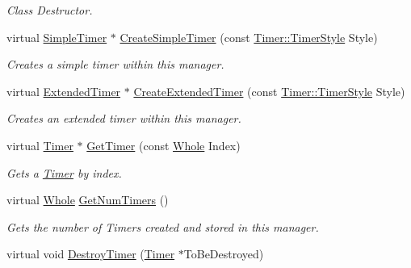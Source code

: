 \begin{DoxyCompactItemize}
\begin{DoxyCompactList}\small\item\em Class Destructor. \item\end{DoxyCompactList}\item 
virtual \hyperlink{classphys_1_1SimpleTimer}{SimpleTimer} $\ast$ \hyperlink{classphys_1_1TimerManager_a7d666a65aee80dd354dfdd6de671e186}{CreateSimpleTimer} (const \hyperlink{classphys_1_1Timer_a1ee86bf43e20329d750c5d582dcce329}{Timer::TimerStyle} Style)
\begin{DoxyCompactList}\small\item\em Creates a simple timer within this manager. \item\end{DoxyCompactList}\item 
virtual \hyperlink{classphys_1_1ExtendedTimer}{ExtendedTimer} $\ast$ \hyperlink{classphys_1_1TimerManager_a44ba4749b2ca6c31994813e97f88ec79}{CreateExtendedTimer} (const \hyperlink{classphys_1_1Timer_a1ee86bf43e20329d750c5d582dcce329}{Timer::TimerStyle} Style)
\begin{DoxyCompactList}\small\item\em Creates an extended timer within this manager. \item\end{DoxyCompactList}\item 
virtual \hyperlink{classphys_1_1Timer}{Timer} $\ast$ \hyperlink{classphys_1_1TimerManager_a5e2912df5f17cd8af1ab8457b95c5a75}{GetTimer} (const \hyperlink{namespacephys_a460f6bc24c8dd347b05e0366ae34f34a}{Whole} Index)
\begin{DoxyCompactList}\small\item\em Gets a \hyperlink{classphys_1_1Timer}{Timer} by index. \item\end{DoxyCompactList}\item 
virtual \hyperlink{namespacephys_a460f6bc24c8dd347b05e0366ae34f34a}{Whole} \hyperlink{classphys_1_1TimerManager_a70ea3a58c3b71cd79a3e9a8b0f069dd5}{GetNumTimers} ()
\begin{DoxyCompactList}\small\item\em Gets the number of Timers created and stored in this manager. \item\end{DoxyCompactList}\item 
virtual void \hyperlink{classphys_1_1TimerManager_ae2dc6385cf9997aacd61ea5a0f9f1c66}{DestroyTimer} (\hyperlink{classphys_1_1Timer}{Timer} $\ast$ToBeDestroyed)

\end{DoxyCompactItemize}
